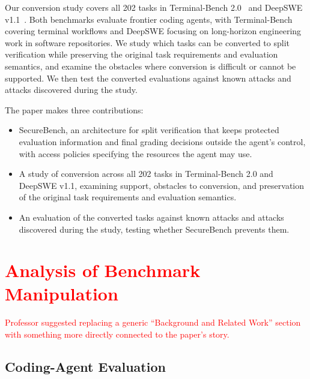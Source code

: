 \documentclass[conference]{IEEEtran}
\newcommand{\draft}[1]{%
    \par\noindent
    {\color{gray}\small #1}
    \par
}
\newcommand{\teacher}[1]{\textcolor{red}{#1}}
\begin{document}
Our conversion study covers all 202 tasks in Terminal-Bench 2.0~\cite{terminalbench} and DeepSWE v1.1~\cite{deepswe}. Both benchmarks evaluate frontier coding agents, with Terminal-Bench covering terminal workflows and DeepSWE focusing on long-horizon engineering work in software repositories. We study which tasks can be converted to split verification while preserving the original task requirements and evaluation semantics, and examine the obstacles where conversion is difficult or cannot be supported. We then test the converted evaluations against known attacks and attacks discovered during the study.

The paper makes three contributions:

\begin{itemize}
    \item SecureBench, an architecture for split verification that keeps protected evaluation information and final grading decisions outside the agent's control, with access policies specifying the resources the agent may use.
    \item A study of conversion across all 202 tasks in Terminal-Bench 2.0 and DeepSWE v1.1, examining support, obstacles to conversion, and preservation of the original task requirements and evaluation semantics.
    \item An evaluation of the converted tasks against known attacks and attacks discovered during the study, testing whether SecureBench prevents them.
\end{itemize}



\section{\teacher{Analysis of Benchmark Manipulation}}

\draft{
\teacher{
Professor suggested replacing a generic ``Background and Related Work''
section with something more directly connected to the paper's story.
}
}

\subsection{Coding-Agent Evaluation}
\end{document}
